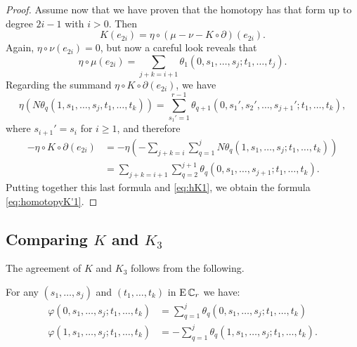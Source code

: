 \begin{proof}
	Assume now that we have proven that the homotopy has that form up to degree $2i-1$ with $i>0$.
	Then
	\[K(e_{2i}) = \eta \circ (\mu-\nu-K \circ \partial)(e_{2i}).\]
	Again, $\eta \circ \nu(e_{2i}) = 0$, but now a careful look reveals that
	\begin{equation}\label{eq:hK1}\eta \circ \mu(e_{2i}) = \sum_{j+k=i+1}\theta_1(0,s_1,\dots,s_j;t_1,\dots,t_j).
	\end{equation}
	Regarding the summand $\eta \circ K \circ \partial(e_{2i})$, we have
	\[\eta(N\theta_q(1,s_1,\dots,s_j,t_1,\dots,t_k)) = \sum_{s_1' = 1}^{r-1}\theta_{q+1}(0,s_1',s_2',\dots,s_{j+1}';t_1,\dots,t_k),\]
	where $s_{i+1}' = s_i$ for $i\geq 1$, and therefore
	\begin{align*} \label{eq:hK2}
		-\eta \circ K \circ \partial(e_{2i})
		&= -\eta\left(-\sum_{j+k = i}\sum_{q=1}^j N\theta_q(1,s_1,\dots,s_j;t_1,\dots,t_k)\right) \\
		&= \sum_{j+k = i+1}\sum_{q=2}^{j+1}\theta_q(0,s_1,\dots,s_{j+1};t_1,\dots,t_k).
	\end{align*}
	Putting together this last formula and \eqref{eq:hK1}, we obtain the formula \eqref{eq:homotopyK'1}.
\end{proof}

\subsection{Comparing $K$ and $K_3$}\label{ss:comparins K and K3}

The agreement of $K$ and $K_3$ follows from the following.

\begin{lemma*}
	For any $(s_1,\dots,s_j)$ and $(t_1,\dots,t_k)$ in $\operatorname{E}\mathbb{C}_r$ we have:
	\begin{align*}
		\varphi(0,s_1,\dots,s_j;t_1,\dots,t_k) &= \sum_{q=1}^j \theta_q(0,s_1,\dots,s_j;t_1,\dots,t_k) \\
		\varphi(1,s_1,\dots,s_j;t_1,\dots,t_k) &= -\sum_{q=1}^j \theta_q(1,s_1,\dots,s_j;t_1,\dots,t_k).
	\end{align*}
\end{lemma*}

